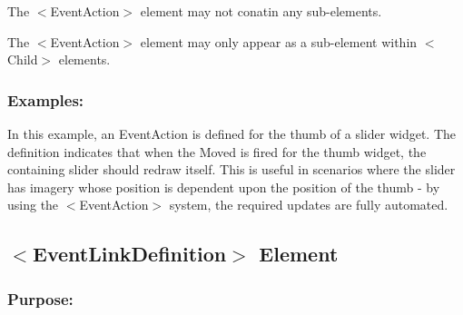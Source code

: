 \begin{DoxyItemize}
\item The {\ttfamily $<$Event\+Action$>$} element may not conatin any sub-\/elements. 
\item The {\ttfamily $<$Event\+Action$>$} element may only appear as a sub-\/element within {\ttfamily $<$Child$>$} elements. 
\end{DoxyItemize}\hypertarget{fal_element_ref_fal_elem_ref_eventaction_4}{}\subsubsection{Examples\+:}\label{fal_element_ref_fal_elem_ref_eventaction_4}
In this example, an Event\+Action is defined for the thumb of a slider widget. The definition indicates that when the {\ttfamily Moved} is fired for the thumb widget, the containing slider should redraw itself. This is useful in scenarios where the slider has imagery whose position is dependent upon the position of the thumb -\/ by using the $<$Event\+Action$>$ system, the required updates are fully automated. 
\begin{DoxyCode}{0}
\end{DoxyCode}
\hypertarget{fal_element_ref_fal_elem_ref_eventlinkdefintion}{}\subsection{$<$\+Event\+Link\+Definition$>$ Element}\label{fal_element_ref_fal_elem_ref_eventlinkdefintion}
\hypertarget{fal_element_ref_fal_elem_ref_eventlinkdefintion_1}{}\subsubsection{Purpose\+:}\label{fal_element_ref_fal_elem_ref_eventlinkdefintion_1}
